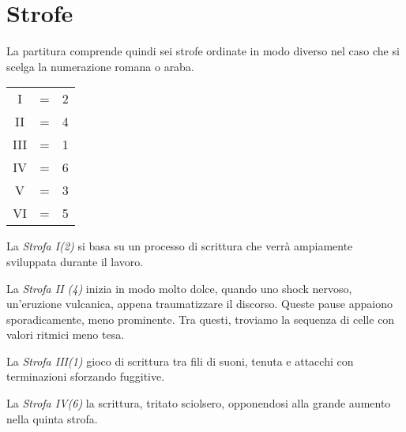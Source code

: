 
\section*{Strofe}

La partitura comprende quindi sei strofe ordinate in modo diverso nel caso che si scelga la numerazione romana o araba.

\begin{minipage}[t]{0.89\columnwidth}%

\begin{table}[H]
\begin{tabular}{c c c}

I 	& = & 2 \\
II	& = & 4 \\
III	& = & 1 \\
IV	& = & 6 \\
V	& = & 3 \\
VI	& = & 5 \\

\end{tabular}
\end{table}%

\end{minipage}%
\bigskip

La \emph{Strofa I(2)} si basa su un processo di scrittura che verrà ampiamente sviluppata durante il lavoro. %

La \emph{Strofa II (4)} inizia in modo molto dolce, quando uno shock nervoso, un'eruzione vulcanica, appena traumatizzare il discorso. Queste pause appaiono sporadicamente, meno prominente. Tra questi, troviamo la sequenza di celle con valori ritmici meno tesa.

La \emph{Strofa III(1)} gioco di scrittura tra fili di suoni, tenuta e attacchi con terminazioni sforzando fuggitive.

La \emph{Strofa IV(6)} la scrittura, tritato sciolsero, opponendosi alla grande aumento nella quinta strofa.

